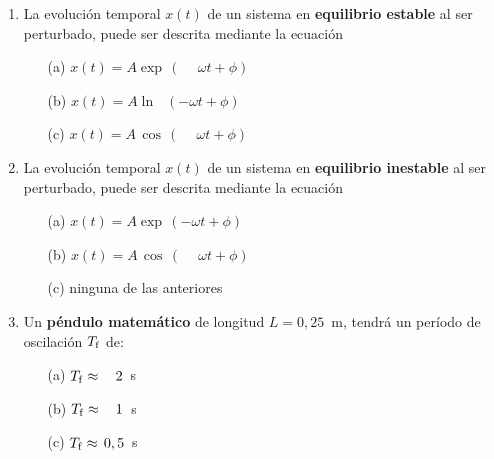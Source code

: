 \documentclass[11pt]{articulo}
\begin{document}
\begin{enumerate}

\item La evoluci\'on temporal $x(t)$ de un sistema en {\bf equilibrio estable} al ser perturbado, puede ser descrita mediante la ecuaci\'on
\begin{enumerate}
\item[(a)] \fbox{$\, \phantom{-}\, $} \hspace*{1cm}   $x(t) = A \exp\, \left(\phantom{-}\omega t + \phi\right)$
\item[(b)] \fbox{$\, \phantom{-}\, $} \hspace*{1cm}   $x(t) = A \ln\, \phantom{s}\left(-\omega t + \phi\right)$
\item[(c)] \fbox{$\, \phantom{-}\, $} \hspace*{1cm}   $x(t) = A\,  \cos\, \left(\phantom{-}\omega t + \phi\right)$  %
\end{enumerate}

\item La evoluci\'on  temporal $x(t)$  de un sistema en {\bf equilibrio inestable} al ser perturbado, puede ser descrita mediante la ecuaci\'on
\begin{enumerate}
\item[(a)] \fbox{$\, \phantom{-}\, $} \hspace*{1cm}   $x(t) = A \exp\, \left(-\omega t + \phi\right)$
\item[(b)] \fbox{$\, \phantom{-}\, $} \hspace*{1cm}   $x(t) = A \, \cos\, \left(\phantom{-}\omega t + \phi\right)$
\item[(c)] \fbox{$\, \phantom{-}\, $} \hspace*{1cm}   ninguna de las anteriores  %
\end{enumerate}

\item Un {\bf p\'endulo matem\'atico} de longitud $L=0,25$~m, tendr\'a un per\'iodo de oscilaci\'on $T_{\rm f}$ de:
\begin{enumerate}
\item[(a)] \fbox{$\, \phantom{-}\, $} \hspace*{1cm}   $T_{\rm f} \approx \, \phantom{0,}2$~s
\item[(b)] \fbox{$\, \phantom{-}\, $} \hspace*{1cm}   $T_{\rm f} \approx \, \phantom{0,}1$~s  %
\item[(c)] \fbox{$\, \phantom{-}\, $} \hspace*{1cm}   $T_{\rm f} \approx \, 0,5$~s
\end{enumerate}


\end{enumerate}
\end{document}
